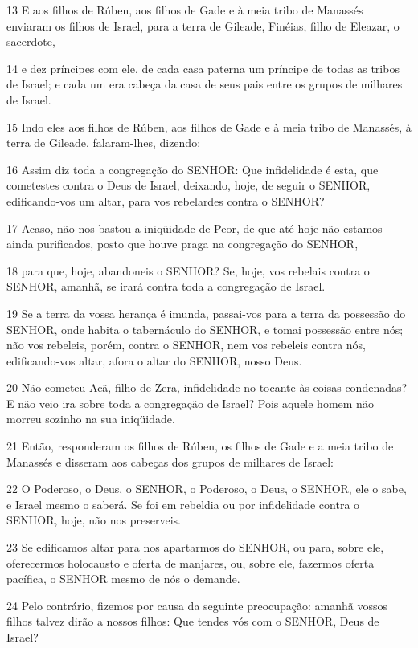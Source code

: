 \par 13 E aos filhos de Rúben, aos filhos de Gade e à meia tribo de Manassés enviaram os filhos de Israel, para a terra de Gileade, Finéias, filho de Eleazar, o sacerdote,
\par 14 e dez príncipes com ele, de cada casa paterna um príncipe de todas as tribos de Israel; e cada um era cabeça da casa de seus pais entre os grupos de milhares de Israel.
\par 15 Indo eles aos filhos de Rúben, aos filhos de Gade e à meia tribo de Manassés, à terra de Gileade, falaram-lhes, dizendo:
\par 16 Assim diz toda a congregação do SENHOR: Que infidelidade é esta, que cometestes contra o Deus de Israel, deixando, hoje, de seguir o SENHOR, edificando-vos um altar, para vos rebelardes contra o SENHOR?
\par 17 Acaso, não nos bastou a iniqüidade de Peor, de que até hoje não estamos ainda purificados, posto que houve praga na congregação do SENHOR,
\par 18 para que, hoje, abandoneis o SENHOR? Se, hoje, vos rebelais contra o SENHOR, amanhã, se irará contra toda a congregação de Israel.
\par 19 Se a terra da vossa herança é imunda, passai-vos para a terra da possessão do SENHOR, onde habita o tabernáculo do SENHOR, e tomai possessão entre nós; não vos rebeleis, porém, contra o SENHOR, nem vos rebeleis contra nós, edificando-vos altar, afora o altar do SENHOR, nosso Deus.
\par 20 Não cometeu Acã, filho de Zera, infidelidade no tocante às coisas condenadas? E não veio ira sobre toda a congregação de Israel? Pois aquele homem não morreu sozinho na sua iniqüidade.
\par 21 Então, responderam os filhos de Rúben, os filhos de Gade e a meia tribo de Manassés e disseram aos cabeças dos grupos de milhares de Israel:
\par 22 O Poderoso, o Deus, o SENHOR, o Poderoso, o Deus, o SENHOR, ele o sabe, e Israel mesmo o saberá. Se foi em rebeldia ou por infidelidade contra o SENHOR, hoje, não nos preserveis.
\par 23 Se edificamos altar para nos apartarmos do SENHOR, ou para, sobre ele, oferecermos holocausto e oferta de manjares, ou, sobre ele, fazermos oferta pacífica, o SENHOR mesmo de nós o demande.
\par 24 Pelo contrário, fizemos por causa da seguinte preocupação: amanhã vossos filhos talvez dirão a nossos filhos: Que tendes vós com o SENHOR, Deus de Israel?
